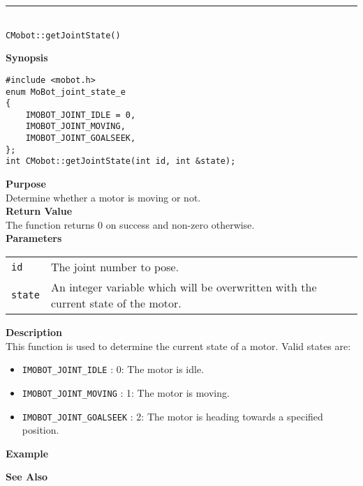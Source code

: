 \noindent
\vspace{5pt}
\rule{4.5in}{0.015in}\\
\noindent
{\LARGE \texttt{CMobot::getJointState()}}\\
{}

\noindent
{\bf Synopsis}\\
\begin{verbatim}
#include <mobot.h>
enum MoBot_joint_state_e
{
    IMOBOT_JOINT_IDLE = 0,
    IMOBOT_JOINT_MOVING,
    IMOBOT_JOINT_GOALSEEK,
};
int CMobot::getJointState(int id, int &state);
\end{verbatim}

\noindent
{\bf Purpose}\\
Determine whether a motor is moving or not.\\

\noindent
{\bf Return Value}\\
The function returns 0 on success and non-zero otherwise.\\

\noindent
{\bf Parameters}
\vspace{-0.1in}
\begin{description}
\item               
\begin{tabular}{p{10 mm}p{145 mm}}
\texttt{id} & The joint number to pose. \\
\texttt{state} & An integer variable which will be overwritten with the current state of the motor. 
\end{tabular}
\end{description}

\noindent
{\bf Description}\\
This function is used to determine the current state of a motor. Valid states are:
\begin{itemize}
\item \texttt{IMOBOT\_JOINT\_IDLE} : 0: The motor is idle.
\item \texttt{IMOBOT\_JOINT\_MOVING} : 1: The motor is moving.
\item \texttt{IMOBOT\_JOINT\_GOALSEEK} : 2: The motor is heading towards a specified position.
\end{itemize}

\noindent
{\bf Example}\\
\noindent

\noindent
{\bf See Also}\\

